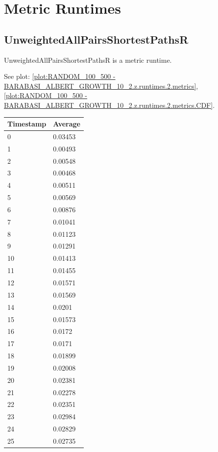 %
%
\section{Metric Runtimes}

\subsection{UnweightedAllPairsShortestPathsR}
UnweightedAllPairsShortestPathsR is a metric runtime.

See plot: \ref{plot:RANDOM_100_500 - BARABASI_ALBERT_GROWTH_10_2.z.runtimes.2.metrics}, \ref{plot:RANDOM_100_500 - BARABASI_ALBERT_GROWTH_10_2.z.runtimes.2.metrics.CDF}.

%
%
\begin{tabular}{|l||l|}
\hline
	\textbf{Timestamp} & \textbf{Average} \\ \hline
	0 & 0.03453 \\ \hline
	1 & 0.00493 \\ \hline
	2 & 0.00548 \\ \hline
	3 & 0.00468 \\ \hline
	4 & 0.00511 \\ \hline
	5 & 0.00569 \\ \hline
	6 & 0.00876 \\ \hline
	7 & 0.01041 \\ \hline
	8 & 0.01123 \\ \hline
	9 & 0.01291 \\ \hline
	10 & 0.01413 \\ \hline
	11 & 0.01455 \\ \hline
	12 & 0.01571 \\ \hline
	13 & 0.01569 \\ \hline
	14 & 0.0201 \\ \hline
	15 & 0.01573 \\ \hline
	16 & 0.0172 \\ \hline
	17 & 0.0171 \\ \hline
	18 & 0.01899 \\ \hline
	19 & 0.02008 \\ \hline
	20 & 0.02381 \\ \hline
	21 & 0.02278 \\ \hline
	22 & 0.02351 \\ \hline
	23 & 0.02984 \\ \hline
	24 & 0.02829 \\ \hline
	25 & 0.02735 \\ \hline

\end{tabular}

